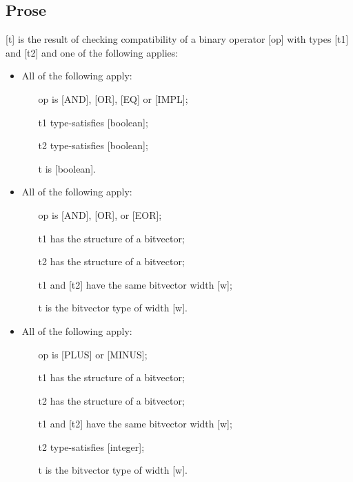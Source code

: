 \documentclass{book}
\begin{document}
\subsection{Prose}
  [t] is the result of checking compatibility of a binary operator [op] with
  types [t1] and [t2] and one of the following applies:
\begin{itemize}
  \item  All of the following apply:
    \begin{itemize}
    \item  [op] is [AND], [OR], [EQ] or [IMPL]; 
    \item  [t1] type-satisfies [boolean];
    \item  [t2] type-satisfies [boolean];
    \item  [t] is [boolean].
    \end{itemize}

  \item  All of the following apply:
    \begin{itemize}
    \item  [op] is [AND], [OR], or [EOR];
    \item  [t1] has the structure of a bitvector;
    \item  [t2] has the structure of a bitvector;
    \item  [t1] and [t2] have the same bitvector width [w];
    \item  [t] is the bitvector type of width [w].
    \end{itemize}

  \item  All of the following apply:
    \begin{itemize}
    \item  [op] is [PLUS] or [MINUS];
    \item  [t1] has the structure of a bitvector;
    \item  [t2] has the structure of a bitvector;
    \item  [t1] and [t2] have the same bitvector width [w];
    \item  [t2] type-satisfies [integer];
    \item  [t] is the bitvector type of width [w].
    \end{itemize}


\end{itemize}
\end{document}

